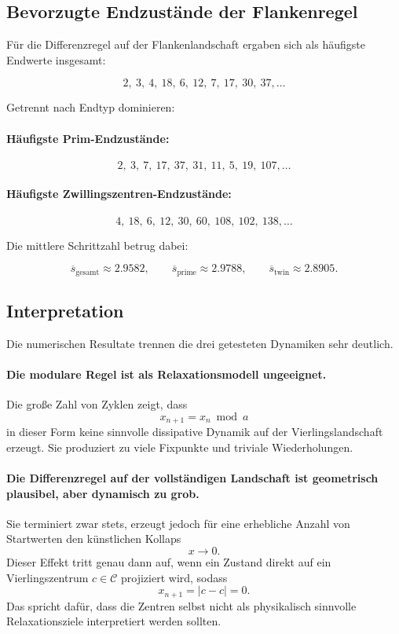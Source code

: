 \documentclass[11pt,a4paper]{article}
\theoremstyle{definition}
\theoremstyle{plain}
\theoremstyle{remark}
\begin{document}
	\subsection{Bevorzugte Endzustände der Flankenregel}
	
	Für die Differenzregel auf der Flankenlandschaft ergaben sich als häufigste Endwerte insgesamt:
	
	\[
	2,\ 3,\ 4,\ 18,\ 6,\ 12,\ 7,\ 17,\ 30,\ 37,\dots
	\]
	
	Getrennt nach Endtyp dominieren:
	
	\paragraph{Häufigste Prim-Endzustände:}
	\[
	2,\ 3,\ 7,\ 17,\ 37,\ 31,\ 11,\ 5,\ 19,\ 107,\dots
	\]
	
	\paragraph{Häufigste Zwillingszentren-Endzustände:}
	\[
	4,\ 18,\ 6,\ 12,\ 30,\ 60,\ 108,\ 102,\ 138,\dots
	\]
	
	Die mittlere Schrittzahl betrug dabei:
	
	\[
	\overline{s}_{\mathrm{gesamt}} \approx 2.9582,
	\qquad
	\overline{s}_{\mathrm{prime}} \approx 2.9788,
	\qquad
	\overline{s}_{\mathrm{twin}} \approx 2.8905.
	\]
	
	\subsection{Interpretation}
	
	Die numerischen Resultate trennen die drei getesteten Dynamiken sehr deutlich.
	
	\paragraph{Die modulare Regel ist als Relaxationsmodell ungeeignet.}
	Die große Zahl von Zyklen zeigt, dass
	\[
	x_{n+1}=x_n\bmod a
	\]
	in dieser Form keine sinnvolle dissipative Dynamik auf der Vierlingslandschaft erzeugt. 
	Sie produziert zu viele Fixpunkte und triviale Wiederholungen.
	
	\paragraph{Die Differenzregel auf der vollständigen Landschaft ist geometrisch plausibel, aber dynamisch zu grob.}
	Sie terminiert zwar stets, erzeugt jedoch für eine erhebliche Anzahl von Startwerten den künstlichen Kollaps
	\[
	x\to 0.
	\]
	Dieser Effekt tritt genau dann auf, wenn ein Zustand direkt auf ein Vierlingszentrum \(c\in\mathcal C\) projiziert wird, sodass
	\[
	x_{n+1}=|c-c|=0.
	\]
	Das spricht dafür, dass die Zentren selbst nicht als physikalisch sinnvolle Relaxationsziele interpretiert werden sollten.
	
\end{document}
